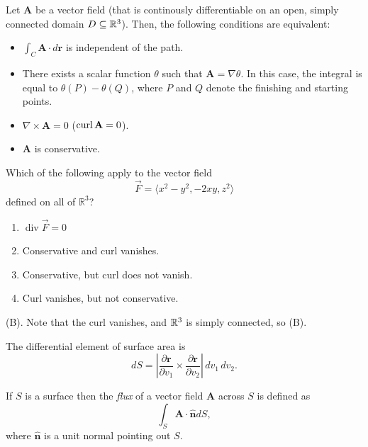 \begin{theorem}
Let $\mathbf{A}$ be a vector field (that is continously differentiable on an open, simply 
connected domain $D\subseteq \mathbb{R}^3$). Then, the following conditions are equivalent:
\begin{itemize}
\item $\int_C \mathbf{A} \cdot d\mathbf{r}$ is independent
of the path.
\item There exists a scalar function $\theta$ such that $\mathbf{A} = \nabla \theta$.
In this case, the integral is equal to $\theta(P) - \theta(Q)$, where $P$ and $Q$ denote the finishing and starting points.
\item $\nabla \times \mathbf{A} = 0$ ($\operatorname{curl} \mathbf{A}= 0$).
\item $\mathbf{A}$ is conservative.
\end{itemize}
\end{theorem}

\begin{exercise}
Which of the following apply to the vector field
\[
\vec{F}=\langle x^2-y^2,-2xy,z^2\rangle
\]
defined on all of $\mathbb{R}^3$?

\begin{enumerate}[label=(\Alph*)]
    \item $\operatorname{div}\vec{F}=0$
    \item Conservative and curl vanishes.
    \item Conservative, but curl does not vanish.
    \item Curl vanishes, but not conservative.
\end{enumerate}
\end{exercise}
\begin{solution}
(B). Note that the curl vanishes, and $\mathbb{R}^3$ is simply connected, so (B).
\end{solution}

\begin{df}
The differential element of surface area is
\[
dS =
\left|
\frac{\partial \mathbf{r}}{\partial v_1}
\times
\frac{\partial \mathbf{r}}{\partial v_2}
\right|
\,dv_1\,dv_2.
\]
\end{df}

\begin{df}
If $S$ is a surface then the \emph{flux} of a vector field $\textbf{A}$ across 
$S$ is defined as
\[
\int_S \textbf{A} \cdot \hat{\textbf{n}} dS,
\]    
where $\hat{\textbf{n}}$ is a unit normal pointing out $S$.
\end{df}

